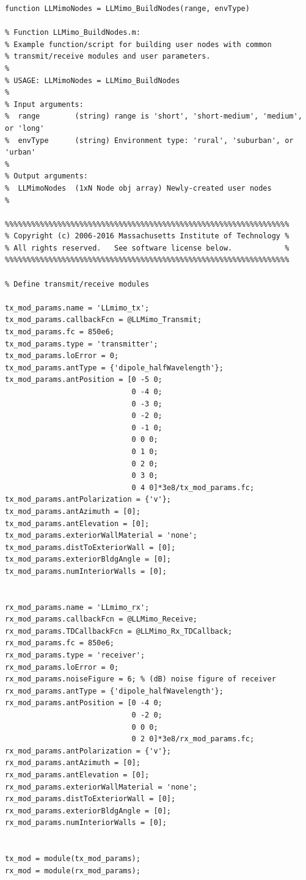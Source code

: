 \begin{lstlisting}[name=llmimoBuild]
function LLMimoNodes = LLMimo_BuildNodes(range, envType)

% Function LLMimo_BuildNodes.m:
% Example function/script for building user nodes with common
% transmit/receive modules and user parameters.
%
% USAGE: LLMimoNodes = LLMimo_BuildNodes
%
% Input arguments:
%  range        (string) range is 'short', 'short-medium', 'medium', or 'long'
%  envType      (string) Environment type: 'rural', 'suburban', or 'urban'
%
% Output arguments:
%  LLMimoNodes  (1xN Node obj array) Newly-created user nodes
%

%%%%%%%%%%%%%%%%%%%%%%%%%%%%%%%%%%%%%%%%%%%%%%%%%%%%%%%%%%%%%%%%%
% Copyright (c) 2006-2016 Massachusetts Institute of Technology %
% All rights reserved.   See software license below.            %
%%%%%%%%%%%%%%%%%%%%%%%%%%%%%%%%%%%%%%%%%%%%%%%%%%%%%%%%%%%%%%%%%

% Define transmit/receive modules

tx_mod_params.name = 'LLmimo_tx';
tx_mod_params.callbackFcn = @LLMimo_Transmit;
tx_mod_params.fc = 850e6;
tx_mod_params.type = 'transmitter';
tx_mod_params.loError = 0;
tx_mod_params.antType = {'dipole_halfWavelength'};
tx_mod_params.antPosition = [0 -5 0;
                             0 -4 0;
                             0 -3 0;
                             0 -2 0;
                             0 -1 0;
                             0 0 0;
                             0 1 0;
                             0 2 0;
                             0 3 0;
                             0 4 0]*3e8/tx_mod_params.fc;
tx_mod_params.antPolarization = {'v'};
tx_mod_params.antAzimuth = [0];
tx_mod_params.antElevation = [0];
tx_mod_params.exteriorWallMaterial = 'none';
tx_mod_params.distToExteriorWall = [0];
tx_mod_params.exteriorBldgAngle = [0];
tx_mod_params.numInteriorWalls = [0];


rx_mod_params.name = 'LLmimo_rx';
rx_mod_params.callbackFcn = @LLMimo_Receive;
rx_mod_params.TDCallbackFcn = @LLMimo_Rx_TDCallback;
rx_mod_params.fc = 850e6;
rx_mod_params.type = 'receiver';
rx_mod_params.loError = 0;
rx_mod_params.noiseFigure = 6; % (dB) noise figure of receiver
rx_mod_params.antType = {'dipole_halfWavelength'};
rx_mod_params.antPosition = [0 -4 0;
                             0 -2 0;
                             0 0 0;
                             0 2 0]*3e8/rx_mod_params.fc;
rx_mod_params.antPolarization = {'v'};
rx_mod_params.antAzimuth = [0];
rx_mod_params.antElevation = [0];
rx_mod_params.exteriorWallMaterial = 'none';
rx_mod_params.distToExteriorWall = [0];
rx_mod_params.exteriorBldgAngle = [0];
rx_mod_params.numInteriorWalls = [0];


tx_mod = module(tx_mod_params);
rx_mod = module(rx_mod_params);

\end{lstlisting}

